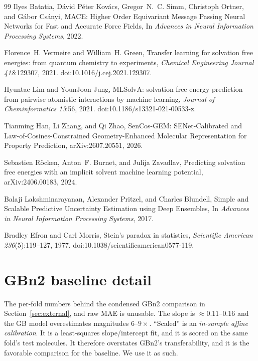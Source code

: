 \documentclass{article}
\begin{document}
\begin{thebibliography}{99}
Ilyes Batatia, D\'avid P\'eter Kov\'acs, Gregor~N.~C. Simm, Christoph Ortner, and G\'abor Cs\'anyi,
MACE: Higher Order Equivariant Message Passing Neural Networks for Fast and Accurate Force Fields,
In {\it Advances in Neural Information Processing Systems}, 2022.

Florence~H. Vermeire and William~H. Green,
Transfer learning for solvation free energies: from quantum chemistry to experiments,
{\it Chemical Engineering Journal} {\it 418}:129307, 2021.
doi:10.1016/j.cej.2021.129307.

Hyuntae Lim and YounJoon Jung,
MLSolvA: solvation free energy prediction from pairwise atomistic interactions by machine learning,
{\it Journal of Cheminformatics} {\it 13}:56, 2021.
doi:10.1186/s13321-021-00533-z.

Tianming Han, Li Zhang, and Qi Zhao,
SenCos-GEM: SENet-Calibrated and Law-of-Cosines-Constrained Geometry-Enhanced Molecular Representation for Property Prediction,
arXiv:2607.20551, 2026.

Sebastien R\"ocken, Anton~F. Burnet, and Julija Zavadlav,
Predicting solvation free energies with an implicit solvent machine learning potential,
arXiv:2406.00183, 2024.

Balaji Lakshminarayanan, Alexander Pritzel, and Charles Blundell,
Simple and Scalable Predictive Uncertainty Estimation using Deep Ensembles,
In {\it Advances in Neural Information Processing Systems}, 2017.

Bradley Efron and Carl Morris,
Stein's paradox in statistics,
{\it Scientific American} {\it 236}(5):119--127, 1977.
doi:10.1038/scientificamerican0577-119.

\end{thebibliography}


\appendix

\section{GBn2 baseline detail}
\label{app:gbn2}

The per-fold numbers behind the condensed GBn2 comparison in
Section~\ref{sec:external}, and raw MAE is unusable. The slope is
$\approx 0.11$--$0.16$ and the GB model overestimates magnitudes $6$--$9\times$.
``Scaled'' is an \emph{in-sample affine calibration}. It is a least-squares
slope/intercept fit, and it is scored on the same fold's test molecules. It
therefore overstates GBn2's transferability, and it is the favorable comparison
for the baseline. We use it as such.
\end{document}
